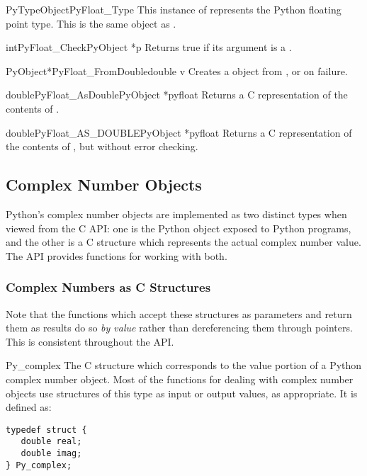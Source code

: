 \documentclass{manual}
\begin{document}
\begin{cvardesc}{PyTypeObject}{PyFloat_Type}
This instance of  represents the Python floating
point type.  This is the same object as .
\end{cvardesc}

\begin{cfuncdesc}{int}{PyFloat_Check}{PyObject *p}
Returns true if its argument is a .
\end{cfuncdesc}

\begin{cfuncdesc}{PyObject*}{PyFloat_FromDouble}{double v}
Creates a  object from , or \NULL{} on
failure.
\end{cfuncdesc}

\begin{cfuncdesc}{double}{PyFloat_AsDouble}{PyObject *pyfloat}
Returns a C  representation of the contents of .
\end{cfuncdesc}

\begin{cfuncdesc}{double}{PyFloat_AS_DOUBLE}{PyObject *pyfloat}
Returns a C  representation of the contents of
, but without error checking.
\end{cfuncdesc}


\subsection{Complex Number Objects \label{complexObjects}}

Python's complex number objects are implemented as two distinct types
when viewed from the C API:  one is the Python object exposed to
Python programs, and the other is a C structure which represents the
actual complex number value.  The API provides functions for working
with both.

\subsubsection{Complex Numbers as C Structures}

Note that the functions which accept these structures as parameters
and return them as results do so \emph{by value} rather than
dereferencing them through pointers.  This is consistent throughout
the API.

\begin{ctypedesc}{Py_complex}
The C structure which corresponds to the value portion of a Python
complex number object.  Most of the functions for dealing with complex
number objects use structures of this type as input or output values,
as appropriate.  It is defined as:

\begin{verbatim}
typedef struct {
   double real;
   double imag;
} Py_complex;
\end{verbatim}
\end{ctypedesc}
\end{document}
